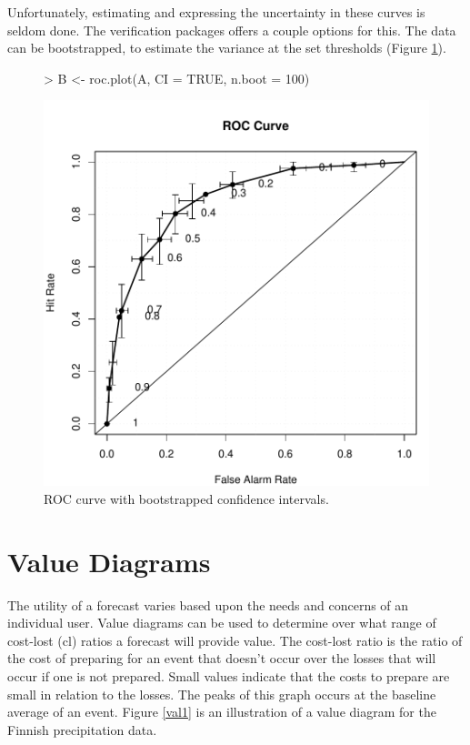 \documentclass{article}
\begin{document}
Unfortunately, estimating and expressing the uncertainty in these
curves  is seldom done.  The verification packages offers a couple
options for this.  The data can be bootstrapped, to estimate the
variance at the set thresholds (Figure \ref{roc2}).   

\begin {center}
\begin{figure}[H]
\begin{Schunk}
\begin{Sinput}
> B <- roc.plot(A, CI = TRUE, n.boot = 100)
\end{Sinput}
\end{Schunk}
\includegraphics{verification-006}
\caption{\label{roc2} ROC curve with bootstrapped confidence
intervals. }
\end{figure}
\end{center}    

\section{Value Diagrams}

The utility of a forecast varies based upon the needs and concerns of
an individual user.  Value diagrams can be used to determine over what
range of cost-lost (cl) ratios a forecast will provide value.  The cost-lost
ratio is the ratio of the cost of preparing for an event that doesn't
occur over the losses that will occur if one is not prepared.  Small
values indicate that the costs to prepare are small in relation to the
losses.  The peaks of this graph occurs at the baseline average of an
event.  Figure \ref{val1} is an illustration of a value diagram for
the Finnish precipitation data.
\end{document}
